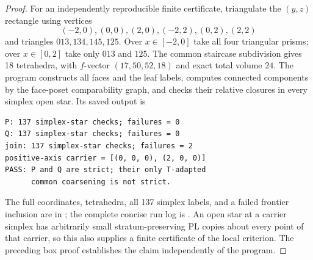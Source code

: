 \begin{proof}
For an independently reproducible finite certificate, triangulate
the $(y,z)$ rectangle using vertices
\[
 (-2,0),(0,0),(2,0),(-2,2),(0,2),(2,2)
\]
and triangles $013,134,145,125$.  Over $x\in[-2,0]$ take all four
triangular prisms; over $x\in[0,2]$ take only $013$ and $125$.
The common staircase subdivision gives 18 tetrahedra, with
$f$-vector $(17,50,52,18)$ and exact total volume $24$.
The program  constructs
all faces and the leaf labels, computes connected components by
the face-poset comparability graph, and checks their relative
closures in every simplex open star.  Its saved output is
\begin{verbatim}
P: 137 simplex-star checks; failures = 0
Q: 137 simplex-star checks; failures = 0
join: 137 simplex-star checks; failures = 2
positive-axis carrier = [(0, 0, 0), (2, 0, 0)]
PASS: P and Q are strict; their only T-adapted
      common coarsening is not strict.
\end{verbatim}
The full coordinates, tetrahedra, all 137 simplex labels, and a
failed frontier inclusion are in
; the complete concise
run log is .
An open star at a carrier simplex has arbitrarily small
stratum-preserving PL copies about every point of that carrier,
so this also supplies a finite certificate of the local criterion.
The preceding box proof establishes the claim independently of
the program.
\end{proof}


